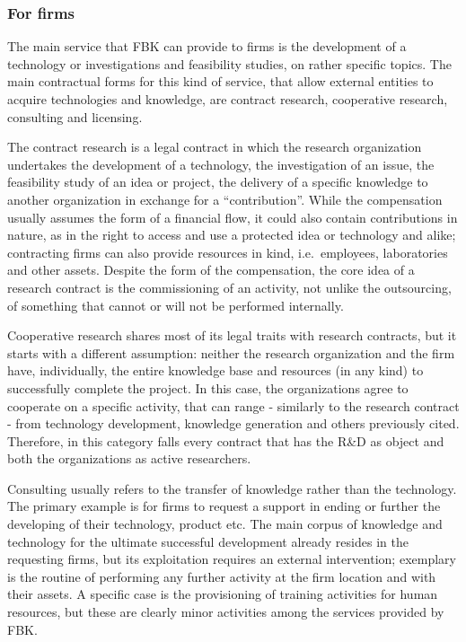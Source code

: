 \subsubsection{For firms}

The main service that FBK can provide to firms is the development of a technology or investigations and feasibility studies, on rather specific topics. The main contractual forms for this kind of service, that allow external entities to acquire technologies and knowledge, are contract research, cooperative research, consulting and licensing. 

The contract research is a legal contract in which the research organization undertakes the development of a technology, the investigation of an issue, the feasibility study of an idea or project, the delivery of a specific knowledge to another organization in exchange for a \enquote{contribution}. While the compensation usually assumes the form of a financial flow, it could also contain contributions in nature, as in the right to access and use a protected idea or technology and alike; contracting firms can also provide resources in kind, i.e.\ employees, laboratories and other assets. Despite the form of the compensation, the core idea of a research contract is the commissioning of an activity, not unlike the outsourcing, of something that cannot or will not be performed internally.

Cooperative research shares most of its legal traits with research contracts, but it starts with a different assumption: neither the research organization and the firm have, individually, the entire knowledge base and resources (in any kind) to successfully complete the project. In this case, the organizations agree to cooperate on a specific activity, that can range - similarly to the research contract - from technology development, knowledge generation and others previously cited. Therefore, in this category falls every contract that has the R\&D as object and both the organizations as active researchers.

Consulting usually refers to the transfer of knowledge rather than the technology. The primary example is for firms to request a support in ending or further the developing of their technology, product etc. The main corpus of knowledge and technology for the ultimate successful development already resides in the requesting firms, but its exploitation requires an external intervention; exemplary is the routine of performing any further activity at the firm location and with their assets. A specific case is the provisioning of training activities for human resources, but these are clearly minor activities among the services provided by FBK.

